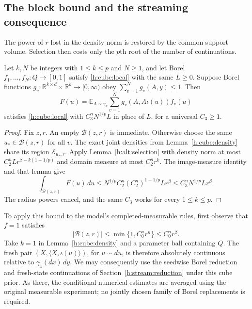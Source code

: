 \subsection{The block bound and the streaming consequence}

The power of \(r\) lost in the density norm is restored by the common
support volume.  Selection then costs only the \(p\)th root of the
number of continuations.

\begin{corollary}
\label{h:cube:block}
Let \(k,N\) be integers with \(1\le k\le p\) and \(N\ge1\), and let Borel
\(f_1,\ldots,f_N:Q\to[0,1]\) satisfy \eqref{h:cube:local} with the
same \(L\ge0\).  Suppose Borel functions
\(g_v:\mathbb R^{k\times d}\times\mathbb R^k\to[0,\infty)\) obey
\(\sum_{v=1}^N g_v(A,y)\le1\).  Then
\[
 F(u)=\mathbb E_{A\sim\gamma_k}
       \sum_{v=1}^N g_v(A,A\iota(u))f_v(u)
\]
satisfies \eqref{h:cube:local} with \(C_3^nN^{1/p}L\) in place of
\(L\), for a universal \(C_3\ge1\).
\end{corollary}

\begin{proof}
Fix \(z,r\).  An empty \(\mathcal B(z,r)\) is immediate.  Otherwise
choose the same \(u_*\in\mathcal B(z,r)\) for all \(v\).  The exact
joint densities from Lemma~\ref{h:cube:density} share its region
\(\mathcal E_{u_*,r}\).  Apply
Lemma~\ref{h:alt:selection} with density norm at most
\(C_2^nLr^{\beta-k(1-1/p)}\) and domain measure at most
\(C_2^nr^k\).  The image-measure identity and that lemma give
\begin{equation}\label{h:cube:selection}
 \int_{\mathcal B(z,r)}F(u)\,du
 \le N^{1/p}C_2^n(C_2^n)^{1-1/p}Lr^\beta
 \le C_3^nN^{1/p}Lr^\beta.
\end{equation}
The radius powers cancel, and the same \(C_3\) works for every
\(1\le k\le p\).
\end{proof}

To apply this bound to the model's completed-measurable rules, first
observe that \(f=1\) satisfies
\[
 |\mathcal B(z,r)|\le\min\{1,C_0^nr^n\}\le C_0^nr^\beta.
\]
Take \(k=1\) in Lemma~\ref{h:cube:density} and a parameter ball
containing \(Q\).  The fresh pair
\((X,\langle X,\iota(u)\rangle)\), for \(u\sim du\), is therefore
absolutely continuous relative to \(\gamma_1(dx)\,dy\).
We may consequently use the seedwise Borel reduction and fresh-state
continuations of Section~\ref{h:stream:reduction} under this cube prior.
As there, the conditional numerical estimates are averaged using the
original measurable experiment; no jointly chosen family of Borel
replacements is required.

